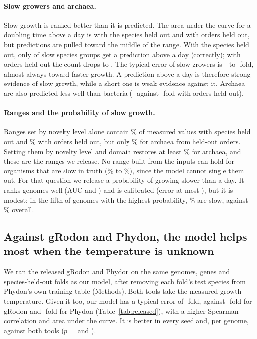 \paragraph{Slow growers and archaea.} Slow growth is ranked better than it is predicted. The area under the curve for a
doubling time above a day is \AucSameGenus with the species held out and \AucNewOrder with orders held out, but predictions
are pulled toward the middle of the range. With the species held out, only \SlowCalledSpecies of \SlowTotalSpecies slow
species groups get a prediction above a day (\SlowCalledTrueSpecies correctly); with orders held out the count drops to \SlowCalledOrder. The typical
error of slow growers is \ErrSlowSpecies- to \ErrSlowOrder-fold, almost always toward faster growth. A prediction above a day
is therefore strong evidence of slow growth, while a short one is weak evidence against it. Archaea are also predicted less
well than bacteria (\ErrArchOrder- against \ErrBactOrder-fold with orders held out).

\paragraph{Ranges and the probability of slow growth.} Ranges set by novelty level alone contain \CovNovAllSpecies\% of
measured values with species held out and \CovNovAllOrder\% with orders held out, but only \CovNovArchOrder\% for archaea from held-out
orders. Setting them by novelty level and domain restores at least \CovDomArchMin\% for archaea, and these are the ranges we
release. No range built from the inputs can hold for organisms that are slow in truth (\CovDomSlowMin\% to
\CovDomSlowMax\%), since the model cannot single them out. For that question we release a probability of growing slower than
a day. It ranks genomes well (AUC \SlowProbAucSpecies and \SlowProbAucOrder) and is calibrated (error at most
\SlowProbECEMax), but it is modest: in the fifth of genomes with the highest probability, \SlowProbTopSpecies\% are slow,
against \SlowBaseRate\% overall.



\subsection{Against gRodon and Phydon, the model helps most when the temperature is unknown}
We ran the released gRodon \citep{weissman2021} and Phydon \citep{xu2025} on the same \RelN genomes, genes and
species-held-out folds as our model, after removing each fold's test species from Phydon's own training table (Methods). Both
tools take the measured growth temperature. Given it too, our model has a typical error of \RelOursTempErr-fold, against
\RelGRodonErr-fold for gRodon and \RelPhydonErr-fold for Phydon (Table~\ref{tab:released}), with a higher Spearman correlation
and area under the curve. It is better in every seed and, per genome, against both tools ($p=$\,\PairTempGRodonP and
\PairTempPhydonP).

